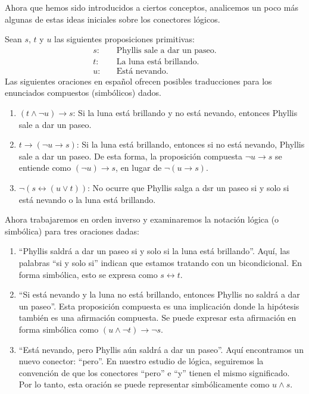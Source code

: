 Ahora que hemos sido introducidos a ciertos conceptos, analicemos un poco más algunas de estas ideas iniciales sobre los conectores lógicos.
\begin{examplebox}{}{}
    Sean $s$, $t$ y $u$ las siguientes proposiciones primitivas:
    \begin{align*}
        s: & \quad \text{Phyllis sale a dar un paseo.} \\
        t: & \quad \text{La luna está brillando.} \\
        u: & \quad \text{Está nevando.}
    \end{align*}
    Las siguientes oraciones en español ofrecen posibles traducciones para los enunciados compuestos (simbólicos) dados.
    \begin{enumerate}[label=\alph*), topsep=6pt, itemsep=0pt]
        \item $(t \land \neg u) \rightarrow s$: Si la luna está brillando y no está nevando, entonces Phyllis sale a dar un paseo.
        \item $t \rightarrow (\neg u \rightarrow s)$: Si la luna está brillando, entonces si no está nevando, Phyllis sale a dar un paseo. De esta forma, la proposición compuesta $\neg u \rightarrow s$ se entiende como $(\neg u) \rightarrow s$, en lugar de $\neg (u \rightarrow s)$.
        \item $\neg(s \leftrightarrow (u \lor t))$: No ocurre que Phyllis salga a dsr un paseo si y solo si está nevando o la luna está brillando.
    \end{enumerate}
    Ahora trabajaremos en orden inverso y examinaremos la notación lógica (o simbólica) para tres oraciones dadas:
    \begin{enumerate}[resume, label=\alph*), topsep=6pt, itemsep=0pt]
        \item “Phyllis saldrá a dar un paseo si y solo si la luna está brillando”. Aquí, las palabras “si y solo si” indican que estamos tratando con un bicondicional. En forma simbólica, esto se expresa como $s \leftrightarrow t$.
        \item “Si está nevando y la luna no está brillando, entonces Phyllis no saldrá a dar un paseo”. Esta proposición compuesta es una implicación donde la hipótesis también es una afirmación compuesta. Se puede expresar esta afirmación en forma simbólica como $(u \land \neg t) \rightarrow \neg s$.
        \item “Está nevando, pero Phyllis aún saldrá a dar un paseo”. Aquí encontramos un nuevo conector: “pero”. En nuestro estudio de lógica, seguiremos la convención de que los conectores “pero” e “y” tienen el mismo significado. Por lo tanto, esta oración se puede representar simbólicamente como $u \land s$.
    \end{enumerate}
\end{examplebox}

